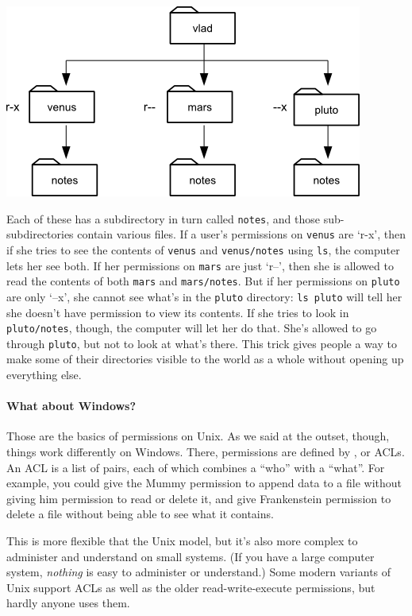 \documentclass{book}
\begin{document}
\includegraphics{novice/extras/img/x-for-directories.png}

Each of these has a subdirectory in turn called \texttt{notes}, and
those sub-subdirectories contain various files. If a user's permissions
on \texttt{venus} are `r-x', then if she tries to see the contents of
\texttt{venus} and \texttt{venus/notes} using \texttt{ls}, the computer
lets her see both. If her permissions on \texttt{mars} are just `r--',
then she is allowed to read the contents of both \texttt{mars} and
\texttt{mars/notes}. But if her permissions on \texttt{pluto} are only
`--x', she cannot see what's in the \texttt{pluto} directory:
\texttt{ls pluto} will tell her she doesn't have permission to view its
contents. If she tries to look in \texttt{pluto/notes}, though, the
computer will let her do that. She's allowed to go through
\texttt{pluto}, but not to look at what's there. This trick gives people
a way to make some of their directories visible to the world as a whole
without opening up everything else.

\mbox{}\paragraph{What about Windows?}

Those are the basics of permissions on Unix. As we said at the outset,
though, things work differently on Windows. There, permissions are
defined by , or
ACLs. An ACL is a list of pairs, each of which combines a ``who'' with a
``what''. For example, you could give the Mummy permission to append
data to a file without giving him permission to read or delete it, and
give Frankenstein permission to delete a file without being able to see
what it contains.

This is more flexible that the Unix model, but it's also more complex to
administer and understand on small systems. (If you have a large
computer system, \emph{nothing} is easy to administer or understand.)
Some modern variants of Unix support ACLs as well as the older
read-write-execute permissions, but hardly anyone uses them.
\end{document}
